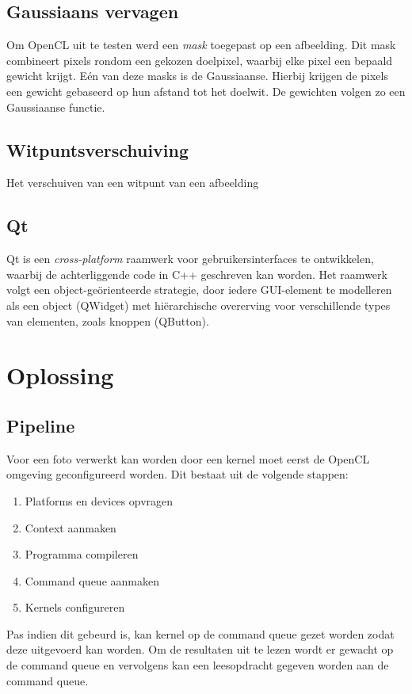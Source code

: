 \documentclass[twocolumn, a4paper]{article}
\begin{document}
\subsection{Gaussiaans vervagen}
Om OpenCL uit te testen werd een \textit{mask} toegepast op een afbeelding. Dit mask combineert pixels rondom een gekozen doelpixel, waarbij elke pixel een bepaald gewicht krijgt. E\'en van deze masks is de Gaussiaanse. Hierbij krijgen de pixels een gewicht gebaseerd op hun afstand tot het doelwit. De gewichten volgen zo een Gaussiaanse functie.

\subsection{Witpuntsverschuiving}
Het verschuiven van een witpunt van een afbeelding 

\subsection{Qt}
Qt is een \emph{cross-platform} raamwerk voor gebruikersinterfaces te ontwikkelen, waarbij de achterliggende code in C++ geschreven kan worden. Het raamwerk volgt een object-geörienteerde strategie, door iedere GUI-element te modelleren als een object (QWidget) met hiërarchische overerving voor verschillende types van elementen, zoals knoppen (QButton).


\section{Oplossing}

\subsection{Pipeline}
Voor een foto verwerkt kan worden door een kernel moet eerst de OpenCL omgeving geconfigureerd worden. Dit bestaat uit de volgende stappen:

\begin{enumerate}
    \item Platforms en devices opvragen 
    \item Context aanmaken
    \item Programma compileren
    \item Command queue aanmaken
    \item Kernels configureren
\end{enumerate}
Pas indien dit gebeurd is, kan kernel op de command queue gezet worden zodat deze uitgevoerd kan worden. Om de resultaten uit te lezen wordt er gewacht op de command queue en vervolgens kan een leesopdracht gegeven worden aan de command queue. 
\end{document}
